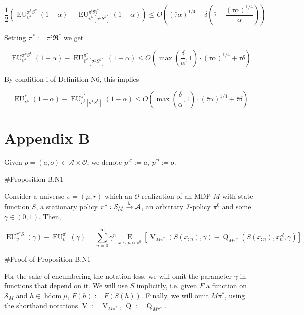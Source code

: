 \documentclass[a4paper]{article}
\newcommand{\Comment}[1]{}
\newcommand{\AP}[1]{\left(#1\right)}
\newcommand{\AB}[1]{\left[#1\right]}
\newcommand{\Ea}[2]{\underset{#1}{\operatorname{E}}\AB{#2}}
\newcommand{\M}{\xrightarrow{\textnormal{k}}}
\newcommand{\Ob}{\mathcal{O}}
\newcommand{\A}{\mathcal{A}}
\newcommand{\St}{\mathcal{S}}
\newcommand{\In}{\mathcal{I}}
\DeclareMathOperator{\HD}{hdom}
\newcommand{\V}{\operatorname{V}}
\newcommand{\Q}{\operatorname{Q}}
\newcommand{\EU}{\operatorname{EU}}
\begin{document}
$$\frac{1}{2}\AP{\EU_{\upsilon^k}^{\pi^k S^{k}}(1-\alpha)-\EU_{\bar{\upsilon}^k\AB{\sigma^k S^k}}^{\pi^\sharp\Re^*}(1-\alpha)} \leq O\AP{(\bar{\tau}\alpha)^{1/4} + \delta\AP{\bar{\tau}+\frac{(\bar{\tau} \alpha)^{1/4}}{\alpha}}}$$

\Comment{Given $h = a_0 b_0 o_0 a_1 b_1 o_1 \ldots a_{n-1} b_{n-1} o_{n-1} \in \overline{\A \times \Ob}^n$, we use the notation 

$$\bar{\Re}^*h := a_0 b_0 o_0 \Re a_1 b_1 o_1 \Re \ldots a_{n-1} b_{n-1} o_{n-1} \Re \in \overline{\A \times \Ob'}^n$$

We define $\pi^*$ as by $\pi^*(h) := \pi^\star\AP{\bar{\Re}^*h}$.}

Setting $\pi^* := \pi^\sharp \Re^*$ we get

$$\EU_{\upsilon^k}^{\pi^k S^{k}}(1-\alpha)-\EU_{\bar{\upsilon}^k\AB{\sigma^k S^{k}}}^{\pi^*}(1-\alpha) \leq O\AP{\max\AP{\frac{\delta}{\alpha},1}\cdot(\bar{\tau} \alpha)^{1/4}+\bar{\tau}\delta}$$

By condition i of Definition N6, this implies

$$\EU_{\upsilon^k}^{*}(1-\alpha)-\EU_{\bar{\upsilon}^k\AB{\sigma^k S^{k}}}^{\pi^*}(1-\alpha) \leq O\AP{\max\AP{\frac{\delta}{\alpha},1}\cdot(\bar{\tau} \alpha)^{1/4}+\bar{\tau}\delta}$$

\section{Appendix B}

Given $p=(a,o)\in\A\times\Ob$, we denote $p^\A:=a$, $p^\Ob:=o$.

\#Proposition B.N1

Consider a universe $\upsilon=(\mu,r)$ which an $\Ob$-realization of an MDP $M$ with state function $S$, a stationary policy $\pi^*: \St_M \M \A$, an arbitrary $\In$-policy $\pi^0$ and some $\gamma \in (0,1)$. Then,

$$\EU_{\upsilon}^{\pi^* S}(\gamma) - \EU_{\upsilon}^{\pi^0}(\gamma)=\sum_{n=0}^\infty {\gamma^n \Ea{x\sim\mu\bowtie\pi^0}{\V_{M\pi^*}\AP{S\AP{x_{:n}},\gamma}-\Q_{M\pi^*}\AP{S\AP{x_{:n}},x_n^\A,\gamma}}}$$

\#Proof of Proposition B.N1

For the sake of encumbering the notation less, we will omit the parameter $\gamma$ in functions that depend on it. We will use $S$ implicitly, i.e. given $F$ a function on $\St_M$ and $h \in \HD{\mu}$, $F(h):=F\AP{S(h)}$. Finally, we will omit $M\pi^*$, using the shorthand notations $\V:=\V_{M\pi^*}$, $\Q:=\Q_{M\pi^*}$.
\end{document}
